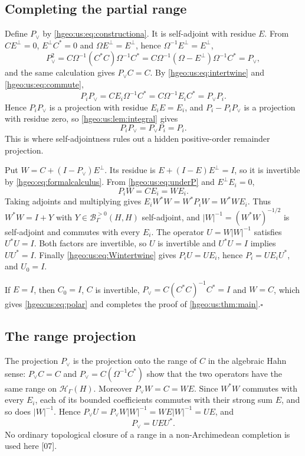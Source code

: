 \documentclass[11pt,letterpaper]{article}
\numberwithin{equation}{section}
\theoremstyle{definition}
\theoremstyle{remark}
\newcommand{\HH}[1]{\mathscr H_\Gamma(#1)}
\newcommand{\Bpos}[2]{\mathscr B^{>0}_\Gamma(#1,#2)}
\newcommand{\abs}[1]{\lvert #1\rvert}
\newcommand{\src}[1]{\textup{\textsf{\small[#1]}}}
\begin{document}
\subsection{Completing the partial range}
Define $P_\vee$ by \eqref{hgeo:us:eq:constructiona}. It is self-adjoint with
residue $E$. From $CE^\perp=0$, $E^\perp C^*=0$ and $\Omega E^\perp=E^\perp$,
hence $\Omega^{-1}E^\perp=E^\perp$,
\[
 P_\vee^2=C\Omega^{-1}(C^*C)\Omega^{-1}C^*
 =C\Omega^{-1}(\Omega-E^\perp)\Omega^{-1}C^*=P_\vee ,
\]
and the same calculation gives $P_\vee C=C$. By
\eqref{hgeo:us:eq:intertwine} and \eqref{hgeo:us:eq:commute},
\[
 P_iP_\vee=CE_i\Omega^{-1}C^*=C\Omega^{-1}E_iC^*=P_\vee P_i .
\]
Hence $P_iP_\vee$ is a projection with residue $E_iE=E_i$, and
$P_i-P_iP_\vee$ is a projection with residue zero, so
\cref{hgeo:us:lem:integral} gives
\begin{equation}\label{hgeo:us:eq:underP}
 P_iP_\vee=P_\vee P_i=P_i .
\end{equation}
This is where self-adjointness rules out a hidden positive-order remainder
projection.

Put $W=C+(I-P_\vee)E^\perp$. Its residue is $E+(I-E)E^\perp=I$, so it is
invertible by \eqref{hgeo:eq:formalcalculus}. From \eqref{hgeo:us:eq:underP}
and $E^\perp E_i=0$,
\begin{equation}\label{hgeo:us:eq:Wintertwine}
 P_iW=CE_i=WE_i .
\end{equation}
Taking adjoints and multiplying gives $E_iW^*W=W^*P_iW=W^*WE_i$. Thus
$W^*W=I+Y$ with $Y\in\Bpos{H}{H}$ self-adjoint, and
$\abs{W}^{-1}=(W^*W)^{-1/2}$ is self-adjoint and commutes with every $E_i$.
The operator $U=W\abs W^{-1}$ satisfies $U^*U=I$. Both factors are
invertible, so $U$ is invertible and $U^*U=I$ implies $UU^*=I$. Finally
\eqref{hgeo:us:eq:Wintertwine} gives $P_iU=UE_i$, hence $P_i=UE_iU^*$, and
$U_0=I$.

If $E=I$, then $C_0=I$, $C$ is invertible, $P_\vee=C(C^*C)^{-1}C^*=I$ and
$W=C$, which gives \eqref{hgeo:us:eq:polar} and completes the proof of
\cref{hgeo:us:thm:main}.\hfill$\square$

\subsection{The range projection}
The projection $P_\vee$ is the projection onto the range of $C$ in the
algebraic Hahn sense: $P_\vee C=C$ and $P_\vee=C(\Omega^{-1}C^*)$ show that
the two operators have the same range on $\HH{H}$. Moreover
$P_\vee W=C=WE$. Since $W^*W$ commutes with every $E_i$, each of its bounded
coefficients commutes with their strong sum $E$, and so does $\abs W^{-1}$.
Hence $P_\vee U=P_\vee W\abs W^{-1}=WE\abs W^{-1}=UE$, and
\begin{equation}\label{hgeo:us:eq:range}
 P_\vee=UEU^* .
\end{equation}
No ordinary topological closure of a range in a non-Archimedean completion
is used here \src{07}.
\end{document}
